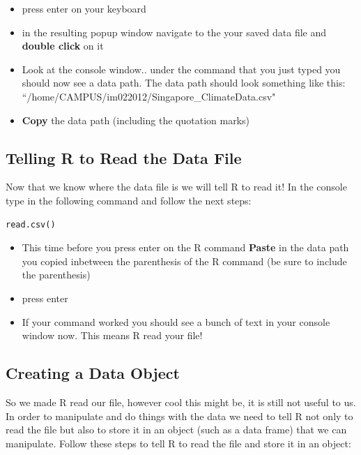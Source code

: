 \documentclass{article}\usepackage[]{graphicx}\usepackage[]{color}
\begin{document}
\begin{itemize} 
\item press enter on your keyboard
\item in the resulting popup window navigate to the your saved data file and \textbf{double click} on it
\item Look at the console window.. under the command that you just typed you should now see a data path. The data path should look something like this: ``/home/CAMPUS/im022012/Singapore\_ClimateData.csv"  %

\item \textbf{Copy} the data path (including the quotation marks)
\end{itemize}

\subsection{Telling R to Read the Data File}

Now that we know where the data file is we will tell R to read it! In the console type in the following command and follow the next steps: 
\begin{verbatim}
read.csv()
\end{verbatim}

\begin{itemize}
\item This time before you press enter on the R command \textbf{Paste} in the data path you copied inbetween the parenthesis of the R command (be sure to include the parenthesis)
\item press enter
\item If your command worked you should see a bunch of text in your console window now. This means R read your file!
\end{itemize}

\subsection{Creating a Data Object}
So we made R read our file, however cool this might be, it is still not useful to us. In order to manipulate and do things with the data we need to tell R not only to read the file but also to store it in an object (such as a data frame) that we can manipulate. Follow these steps to tell R to read the file and store it in an object: \\
\end{document}
